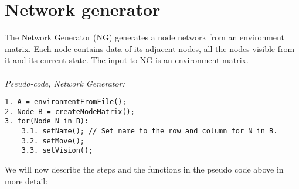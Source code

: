 \section{Network generator}
The Network Generator (NG) generates a node network from an environment matrix. Each node contains data of its adjacent nodes, all the nodes visible from it and its current state. The input to NG is an environment matrix.\\
\\
\noindent \emph{Pseudo-code, Network Generator:}
\begin{verbatim}
1. A = environmentFromFile();
2. Node B = createNodeMatrix();
3. for(Node N in B):
    3.1. setName(); // Set name to the row and column for N in B.
    3.2. setMove();
    3.3. setVision();
\end{verbatim}
We will now describe the steps and the functions in the pseudo code above in more detail:
